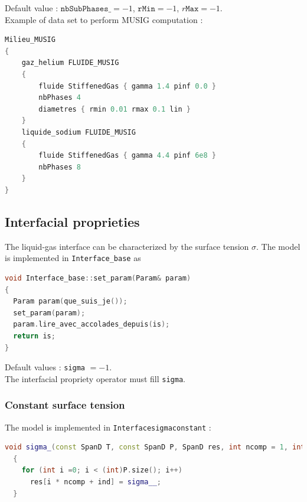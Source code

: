 Default value : $\texttt{nbSubPhases\_} = -1$, $\texttt{rMin}=-1$, $r\texttt{Max}=-1$.\\
Example of data set to perform MUSIG computation :
\begin{lstlisting}[language=c++]
Milieu_MUSIG
{
    gaz_helium FLUIDE_MUSIG
    {
        fluide StiffenedGas { gamma 1.4 pinf 0.0 }
        nbPhases 4
        diametres { rmin 0.01 rmax 0.1 lin }
    }
    liquide_sodium FLUIDE_MUSIG
    {
        fluide StiffenedGas { gamma 4.4 pinf 6e8 }
        nbPhases 8
    }
}
\end{lstlisting}

\subsection{Interfacial proprieties}
The liquid-gas interface can be characterized by the surface tension $\sigma$.
The model is implemented in \texttt{Interface\_base} as
\begin{lstlisting}[language=c++]
void Interface_base::set_param(Param& param)
{
  Param param(que_suis_je());
  set_param(param);
  param.lire_avec_accolades_depuis(is);
  return is;
}
\end{lstlisting}
Default values : \texttt{sigma\textunderscore \textunderscore} $= -1.$\\
The interfacial propriety operator must fill \texttt{sigma\textunderscore}.

\subsubsection{Constant surface tension}
The model is implemented in \texttt{Interface\textunderscore sigma\textunderscore constant} :
\begin{lstlisting}[language=c++]
void sigma_(const SpanD T, const SpanD P, SpanD res, int ncomp = 1, int ind = 0) const override
  {
    for (int i =0; i < (int)P.size(); i++)
      res[i * ncomp + ind] = sigma__;
  }
\end{lstlisting}

